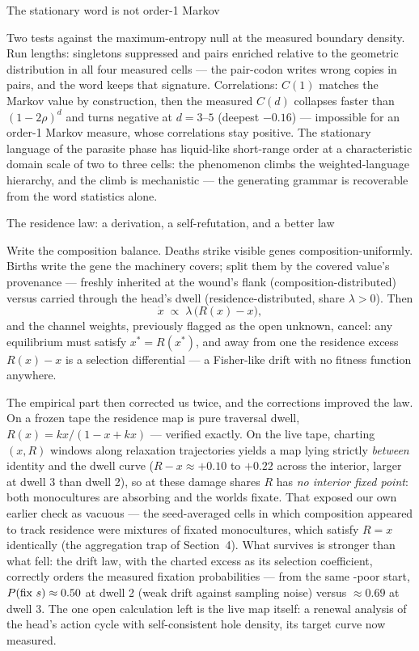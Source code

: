 \secc The stationary word is not order-1 Markov

Two tests against the maximum-entropy null at the measured
boundary density. Run lengths: singletons suppressed and pairs
enriched relative to the geometric distribution in all four
measured cells --- the pair-codon writes wrong copies in pairs,
and the word keeps that signature. Correlations: $C(1)$ matches
the Markov value by construction, then the measured $C(d)$
collapses faster than $(1-2\rho)^d$ and turns negative at
$d=3$--$5$ (deepest $-0.16$) --- impossible for an order-1 Markov
measure, whose correlations stay positive. The stationary
language of the parasite phase has liquid-like short-range order
at a characteristic domain scale of two to three cells: the
phenomenon climbs the weighted-language hierarchy, and the climb
is mechanistic --- the generating grammar is recoverable from the
word statistics alone.

\secc The residence law: a derivation, a self-refutation, and a better law

Write the composition balance. Deaths strike visible genes
composition-uniformly. Births write the gene the machinery covers;
split them by the covered value's provenance --- freshly inherited
at the wound's flank (composition-distributed) versus carried
through the head's dwell (residence-distributed, share
$\lambda>0$). Then
$$
\dot x \;\propto\; \lambda\,\bigl(R(x)-x\bigr),
$$
and the channel weights, previously flagged as the open unknown,
cancel: any equilibrium must satisfy $x^*=R(x^*)$, and away from
one the residence excess $R(x)-x$ is a selection differential ---
a Fisher-like drift with no fitness function anywhere.

The empirical part then corrected us twice, and the corrections
improved the law. On a frozen tape the residence map is pure
traversal dwell, $R(x)=kx/(1-x+kx)$ --- verified exactly. On the
live tape, charting $(x,R)$ windows along relaxation trajectories
yields a map lying strictly {\it between} identity and the dwell
curve ($R-x\approx+0.10$ to $+0.22$ across the interior, larger
at dwell 3 than dwell 2), so at these damage shares $R$ has {\it
no interior fixed point}: both monocultures are absorbing and the
worlds fixate. That exposed our own earlier check as vacuous ---
the seed-averaged cells in which composition appeared to track
residence were mixtures of fixated monocultures, which satisfy
$R=x$ identically (the aggregation trap of Section~4). What
survives is stronger than what fell: the drift law, with the
charted excess as its selection coefficient, correctly orders the
measured fixation probabilities --- from the same -poor
start, $P(\hbox{fix }s)\approx0.50$ at dwell 2 (weak drift
against sampling noise) versus $\approx0.69$ at dwell 3. The one
open calculation left is the live map itself: a renewal analysis
of the head's action cycle with self-consistent hole density, its
target curve now measured.

